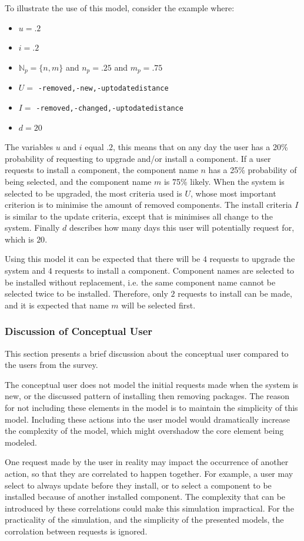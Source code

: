 To illustrate the use of this model, consider the example where:
\begin{itemize}
  \item $u =.2$
  \item $i =.2$
  \item $\mathbb{N}_p = \{n,m\}$ and  $n_p = .25$ and $m_p = .75$
  \item $U = $ \texttt{-removed,-new,-uptodatedistance}
  \item $I = $ \texttt{-removed,-changed,-uptodatedistance}
  \item $d = 20$
\end{itemize}
The variables $u$ and $i$ equal $.2$, this means that on any day the user has a 20\% probability of requesting to upgrade and/or install a component.
If a user requests to install a component, the component name $n$ has a 25\% probability of being selected, and the component name $m$ is 75\% likely. 
When the system is selected to be upgraded, the most criteria used is $U$, whose most important criterion is to minimise the amount of removed components.
The install criteria $I$ is similar to the update criteria, except that is minimises all change to the system.
Finally $d$ describes how many days this user will potentially request for, which is $20$.

Using this model it can be expected that there will be $4$ requests to upgrade the system and $4$ requests to install a component.
Component names  are selected to be installed without replacement, i.e. the same component name cannot be selected twice to be installed.
Therefore, only $2$ requests to install can be made, and it is expected that name $m$ will be selected first.


\subsubsection{Discussion of Conceptual User}
This section presents a brief discussion about the conceptual user compared to the users from the survey.

The conceptual user does not model the initial requests made when the system is new, 
or the discussed pattern of installing then removing packages.
The reason for not including these elements in the model is to maintain the simplicity of this model.
Including these actions into the user model would dramatically increase the complexity of the model, 
which might overshadow the core element being modeled. 

One request made by the user in reality may impact the occurrence of another action, so that they are correlated to happen together.
For example, a user may select to always update before they install, or to select a component to be installed because of another installed component.
The complexity that can be introduced by these correlations could make this simulation impractical.
For the practicality of the simulation, and the simplicity of the presented models, the corrolation between requests is ignored.

